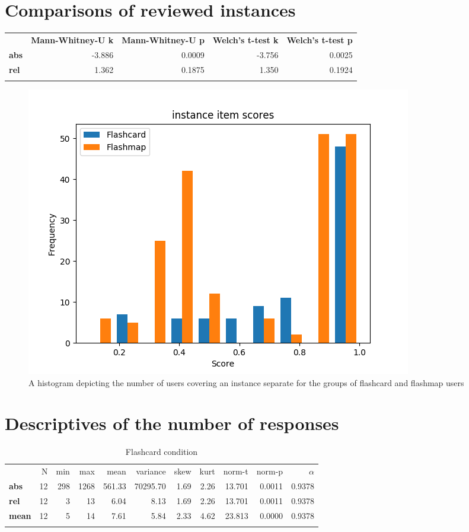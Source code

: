 \section{Comparisons of reviewed instances}

\begin{longtable}[c]{@{}lrrrr@{}}
\toprule\addlinespace
& \textbf{Mann-Whitney-U k} & \textbf{Mann-Whitney-U p} &
\textbf{Welch's t-test k} & \textbf{Welch's t-test p}
\\\addlinespace
\midrule\endhead
\textbf{abs} & -3.886 & 0.0009 & -3.756 & 0.0025
\\\addlinespace
\textbf{rel} & 1.362 & 0.1875 & 1.350 & 0.1924
\\\addlinespace
\bottomrule
\end{longtable}

\begin{figure}
    \centering
    \includegraphics[width=.7\textwidth]{img/instance_diff.png}
    \caption{A histogram depicting the number of users covering an instance separate for the groups of flashcard and flashmap users}
    \label{fig:instance_diff}
\end{figure}

\FloatBarrier
\section{Descriptives of the number of responses}

\begin{longtable}[c]{@{}lrrrrrrrrrr@{}}
\caption{Flashcard condition}
\endfirsthead
\endhead
\toprule\addlinespace
& N & min & max & mean & variance & skew & kurt & norm-t &
norm-p & $\alpha$
\\\addlinespace
\midrule
\textbf{abs} & 12 & 298 & 1268 & 561.33 & 70295.70 & 1.69 & 2.26 &
13.701 & 0.0011 & 0.9378
\\\addlinespace
\textbf{rel} & 12 & 3 & 13 & 6.04 & 8.13 & 1.69 & 2.26 & 13.701 & 0.0011
& 0.9378
\\\addlinespace
\textbf{mean} & 12 & 5 & 14 & 7.61 & 5.84 & 2.33 & 4.62 & 23.813 &
0.0000 & 0.9378
\\\addlinespace
\bottomrule
    \label{tab:responses_fc}
\end{longtable}

